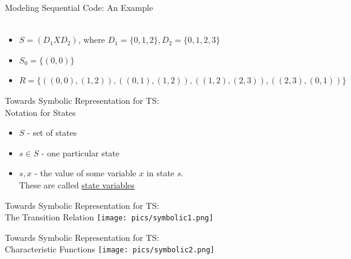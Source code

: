 \documentclass{beamer}
\begin{document}
\begin{frame}{Modeling Sequential Code: An Example}
\hfill
{} \\
 \\
\begin{itemize}
\item<3-> $S = (D_1 X D_2)$, where $D_1 = \{0,1,2\}, D_2 = \{0,1,2,3\}$
\item<3-> $S_0 = \{(0,0)\}$
\item<3-> $R = \{ ((0,0),(1,2)), ((0,1),(1,2)), ((1,2),(2,3)), ((2,3),(0,1))  \}$
\end{itemize}
\end{frame}

\begin{frame}{Towards Symbolic Representation for TS:\\
Notation for States}
\begin{itemize}
\item $S$ - set of states

\item $s \in S$ - one particular state

\item $s,x$ - the value of some variable $x$ in state $s$. \\
These are called \underline{state variables}
\end{itemize}
\end{frame}

\begin{frame}{Towards Symbolic Representation for TS:\\The Transition Relation}
\texttt{[image: pics/symbolic1.png]}
\end{frame}

\begin{frame}{Towards Symbolic Representation for TS:\\Characteristic Functions}
\texttt{[image: pics/symbolic2.png]}
\end{frame}
\end{document}
